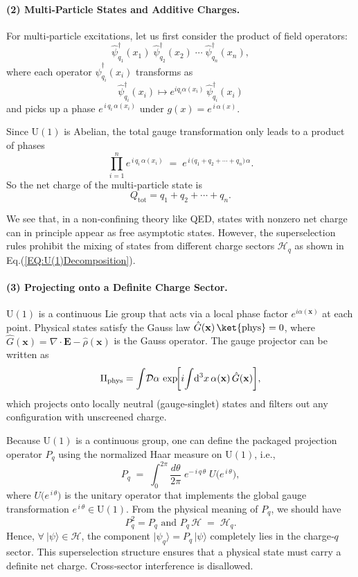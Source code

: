 \documentclass[12pt,a4paper]{article}
\begin{document}
\paragraph{(2) Multi‐Particle States and Additive Charges.}
For multi‐particle excitations, let us first consider the product of field operators:
\[
\hat{\psi}^\dagger_{q_1}(x_1)\;\hat{\psi}^\dagger_{q_2}(x_2)
\;\cdots\;\hat{\psi}^\dagger_{q_n}(x_n),
\]
where each operator $\hat{\psi}^\dagger_{q_i}(x_i)$ transforms as
\[
\hat{\psi}^\dagger_{q_i}(x_i) \mapsto e^{i q_i \alpha(x_i)}\, \hat{\psi}^\dagger_{q_i}(x_i)
\]
and picks up a phase $e^{\,i\,q_i\,\alpha(x_i)}$ under $g(x)=e^{\,i\,\alpha(x)}$.


Since $\mathrm{U}(1)$ is Abelian, the total gauge transformation only leads to a product of phases
\[
\prod_{i=1}^n
e^{\,i\,q_i\,\alpha(x_i)}
\;=\;
e^{\,i\,\bigl(q_1+q_2+\cdots+q_n\bigr)\,\alpha}.
\]
So the net charge of the multi‐particle state is
\[
Q_\text{tot} = q_1 + q_2 + \cdots + q_n.
\]


We see that, in a non‐confining theory like QED, states with nonzero net charge can in principle appear as free asymptotic states.
However, the superselection rules prohibit the mixing of states from different charge sectors $\mathcal{H}_q$ as shown in Eq.(\ref{EQ:U(1)Decomposition}).



\paragraph{(3) Projecting onto a Definite Charge Sector.}


$\mathrm{U}(1)$ is a continuous Lie group that acts via a local phase factor $e^{i\alpha(\mathbf x)}$ at each point.
Physical states satisfy the Gauss law $\hat G(\mathbf x)\,\ket{\mathrm{phys}} = 0$, where $\hat G(\mathbf x)=\nabla\!\cdot\!\mathbf E - \hat\rho(\mathbf x)$ is the Gauss operator.
The gauge projector can be written as
$$
\Pi_{\rm phys}
= \int\!\mathcal D\alpha \,
\exp\!\biggl[i\!\int\!{\rm d}^3x\,\alpha(\mathbf x)\,\hat G(\mathbf x)\biggr],
$$
which projects onto locally neutral (gauge-singlet) states and filters out any configuration with unscreened charge.



Because $\mathrm{U}(1)$ is a continuous group, one can define the packaged projection operator $P_q$ using the normalized Haar measure on $\mathrm{U}(1)$, i.e.,
\[
P_q
\;=\;
\int_{0}^{2\pi}
\frac{d\theta}{2\pi}
\;e^{-\,i\,q\,\theta}
\;U\!\bigl(e^{\,i\,\theta}\bigr),
\]
where $U\bigl(e^{\,i\,\theta}\bigr)$ is the unitary operator that implements the global gauge transformation $e^{\,i\,\theta}\in \mathrm{U}(1)$.
From the physical meaning of $P_q$, we should have
\[
P_q^2=P_q 
\text{  and  }
P_q\,\mathcal{H}
\;=\;\mathcal{H}_q.
\]
Hence, $\forall ~ \vert \psi\rangle \in \mathcal{H}$, the component $\vert \psi_q\rangle = P_q\,\vert \psi\rangle$ completely lies in the charge‐$q$ sector.
This superselection structure ensures that a physical state must carry a definite net charge. Cross‐sector interference is disallowed.
\end{document}
